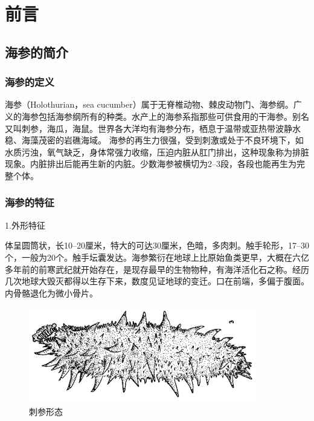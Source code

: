 \documentclass{QITthesis}
\begin{document}

\section{前言}
\setlength{\baselineskip}{20pt}
\fancyhf{}
\renewcommand{\headrulewidth}{0.5pt}
\subsection{海参的简介}
\subsubsection{海参的定义}

海参（Holothurian，sea cucumber）属于无脊椎动物、棘皮动物门、海参纲。广义的海参包括海参纲所有的种类。水产上的海参系指那些可供食用的干海参。别名又叫刺参，海瓜，海鼠。世界各大洋均有海参分布，栖息于温带或亚热带波静水稳、海藻茂密的岩礁海域。
海参的再生力很强，受到刺激或处于不良环境下，如水质污浊，氧气缺乏，身体常强力收缩，压迫内脏从肛门排出，这种现象称为排脏现象。内脏排出后能再生新的内脏。少数海参被横切为2--3段，各段也能再生为完整个体。

\subsubsection{海参的特征}

1.外形特征

体呈圆筒状，长10--20厘米，特大的可达30厘米，色暗，多肉刺。触手轮形，17--30个，一般为20个。触手坛囊发达。海参繁衍在地球上比原始鱼类更早，大概在六亿多年前的前寒武纪就开始存在，是现存最早的生物物种，有海洋活化石之称。经历几次地球大毁灭都得以生存下来，数度见证地球的变迁。口在前端，多偏于腹面。内骨骼退化为微小骨片。

\begin{figure}[H]
    \centering
    \includegraphics[width=.5\textwidth]{example_figures/图片1.png}
    \caption{刺参形态}
\end{figure}
\end{document}
